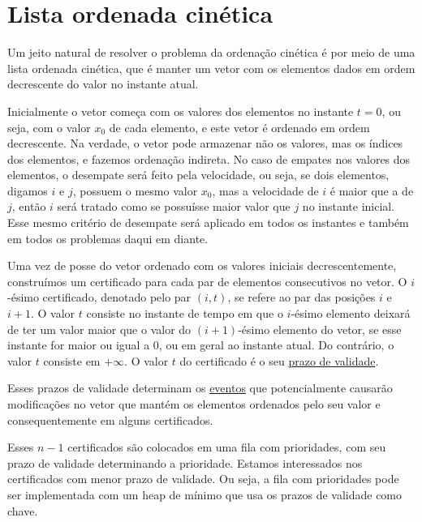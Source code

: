 

\section{Lista ordenada cinética}
\label{lista:secao}
Um jeito natural de resolver o problema da ordenação cinética é por
meio de uma lista ordenada cinética, que é manter um vetor com os
elementos dados em ordem decrescente do valor no instante atual.

Inicialmente o vetor começa com os valores dos elementos no instante
$t = 0$, ou seja, com o valor $x_0$ de cada elemento, e este vetor é
ordenado em ordem decrescente. Na verdade, o vetor pode armazenar
não os valores, mas os índices dos elementos, e fazemos ordenação
indireta. No caso de empates nos valores dos elementos, o desempate
será feito pela velocidade, ou seja, se dois elementos, digamos $i$
e $j$, possuem o mesmo valor $x_0$, mas a velocidade de $i$ é maior
que a de $j$, então $i$ será tratado como se possuísse maior valor
que $j$ no instante inicial. Esse mesmo critério de desempate será
aplicado em todos os instantes e também em todos os problemas daqui
em diante.

Uma vez de posse do vetor ordenado com os valores iniciais
decrescentemente, construímos um certificado para cada par de
elementos consecutivos no vetor. O $i$-ésimo certificado, denotado
pelo par $(i, t)$, se refere ao par das posições $i$ e $i + 1$. O
valor $t$ consiste no instante de tempo em que o $i$-ésimo elemento
deixará de ter um valor maior que o valor do $(i + 1)$-ésimo
elemento do vetor, se esse instante for maior ou igual a 0, ou em
geral ao instante atual. Do contrário, o valor $t$ consiste em
$+\infty$. O valor $t$ do certificado é o seu \underline{prazo de
validade}.

Esses prazos de validade determinam os \underline{eventos} que
potencialmente causarão modificações no vetor que mantém os
elementos ordenados pelo seu valor e consequentemente em alguns
certificados.

Esses $n - 1$ certificados são colocados em uma fila com
prioridades, com seu prazo de validade determinando a prioridade.
Estamos interessados nos certificados com menor prazo de validade.
Ou seja, a fila com prioridades pode ser implementada com um heap de
mínimo que usa os prazos de validade como chave.

